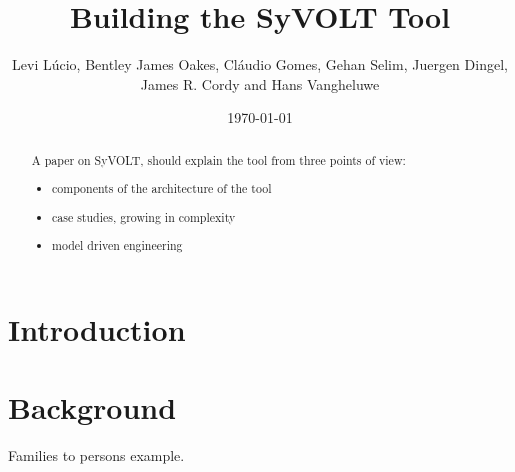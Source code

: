 \documentclass[conference]{IEEEtran}
\begin{document}
\title{Building the SyVOLT Tool}
\author{Levi L\'{u}cio, Bentley James Oakes, Cl\'audio Gomes, Gehan Selim,
Juergen Dingel, James R. Cordy and Hans Vangheluwe}

\author{
	}

\date{\today}


\maketitle



\begin{abstract}
A paper on SyVOLT, should explain the tool from three points of view:
\begin{itemize}
  \item components of the architecture of the tool
  \item case studies, growing in complexity
  \item model driven engineering
\end{itemize}

\end{abstract}


\section{Introduction}
\label{sec:intro}


\section{Background}

Families to persons example.
\end{document}
